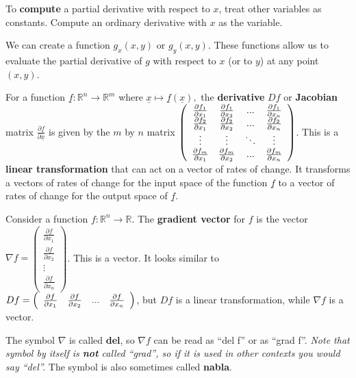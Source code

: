 \documentclass[12pt,letterpaper,noanswers]{exam}
\newcommand{\mb}[1]{\underline{#1}}
\begin{document}
\begin{tcolorbox}
To \textbf{compute} a partial derivative with respect to $x$, treat other variables as constants. Compute an ordinary derivative with $x$ as the variable.

We can create a function $g_x(x,y)$ or $g_y(x,y)$.  These functions allow us to evaluate the partial derivative of $g$ with respect to $x$ (or to $y$) at any point $(x,y)$.

For a function $\mb{f}: \mathbb{R}^n\rightarrow\mathbb{R}^m$ where $\mb{x}\mapsto\mb{f}(\mb{x}),$ the \textbf{derivative} $Df$ or \textbf{Jacobian} matrix $\frac{\partial\mb{f}}{\partial \mb{x}}$ is given by the $m$ by $n$ matrix $\left(\begin{array}{c c c c}\frac{\partial f_1}{\partial x_1} & \frac{\partial f_1}{\partial x_2} & ... & \frac{\partial f_1}{\partial x_n} \\
\frac{\partial f_2}{\partial x_1} & \frac{\partial f_2}{\partial x_2} & ... & \frac{\partial f_2}{\partial x_n} \\
\vdots & \vdots & \ddots & \vdots \\
\frac{\partial f_m}{\partial x_1} & \frac{\partial f_m}{\partial x_2} & ... & \frac{\partial f_m}{\partial x_n} \\
\end{array}\right)$.  This is a \textbf{linear transformation} that can act on a vector of rates of change.  It transforms a vectors of rates of change for the input space of the function $\mb{f}$ to a vector of rates of change for the output space of $\mb{f}$.
\end{tcolorbox}
\begin{tcolorbox}
Consider a function $f:\mathbb{R}^n \rightarrow \mathbb{R}$.  The \textbf{gradient vector} for $f$ is the vector $\nabla f = \left(\begin{array}{c} \frac{\partial f}{\partial x_1} \\ \frac{\partial f}{\partial x_2} \\ \vdots \\ \frac{\partial f}{\partial x_n}\end{array}\right)$.  This is a vector.  It looks similar to $Df = \left(\begin{array}{c c c c}\frac{\partial f}{\partial x_1} & \frac{\partial f}{\partial x_2} & ... & \frac{\partial f}{\partial x_n}\end{array}\right)$, but $Df$ is a linear transformation, while $\nabla f$ is a vector.

The symbol $\nabla$ is called \textbf{del}, so $\nabla f$ can be read as ``del f'' or as ``grad f''.  \emph{Note that symbol by itself is \textbf{not} called ``grad'', so if it is used in other contexts you would say ``del''.}  The symbol is also sometimes called \textbf{nabla}.


\end{tcolorbox}
\end{document}
